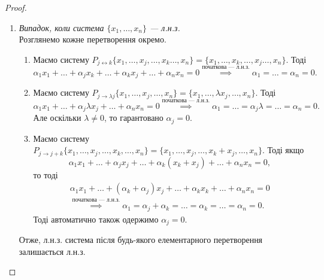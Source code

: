 \documentclass{math_library}
\begin{document}
	\begin{proof}
	\leavevmode
	\begin{enumerate}[topsep=0pt, wide=0pt,label={\roman*.}]
	\item \textit{Випадок, коли система $\{x_1, \dots, x_n\}$ --- л.н.з.}\\	
	Розглянемо кожне перетворення окремо.
	\begin{enumerate}[wide = 0pt, label={\Roman*.}]
	\item Маємо систему $P_{j \leftrightarrow k}\{x_1, \dots, x_j, \dots, x_k \dots, x_n\} = \{x_1, \dots, x_k, \dots, x_j \dots, x_n\}$. Тоді
	\[
	\alpha_1 x_1 + \dots + \alpha_j x_k + \dots + \alpha_k x_j + \dots + \alpha_n x_n = 0 \overset{\text{початкова --- л.н.з.}}{\implies} \alpha_1 = \dots = \alpha_n = 0.
	\]
	\item Маємо систему $P_{j \to \lambda j}\{x_1, \dots, x_j, \dots, x_n\} = \{x_1, \dots, \lambda x_j, \dots, x_n\}$. Тоді
	\[
	\alpha_1 x_1 + \dots + \alpha_j \lambda x_j + \dots + \alpha_n x_n = 0 \overset{\text{початкова --- л.н.з.}}{\implies} \alpha_1 = \dots = \alpha_j \lambda = \dots = \alpha_n = 0.
	\]
	Але оскільки $\lambda \neq 0$, то гарантовано $\alpha_j = 0$.
	
	\item Маємо систему $P_{j \to j+k}\{x_1, \dots, x_j, \dots, x_k, \dots, x_n\} = \{x_1, \dots, x_j, \dots,  x_k + x_j, \dots, x_n\}$. Тоді якщо
	\[
	\alpha_1 x_1 + \dots + \alpha_j x_j + \dots + \alpha_k(x_k + x_j) + \dots + \alpha_n x_n = 0,
	\]
	то тоді
	\begin{align*}
	\alpha_1 x_1 + \dots + (\alpha_k + \alpha_j) x_j + \dots + \alpha_k x_k + \dots + \alpha_n x_n = 0 \\
	\overset{\text{початкова --- л.н.з.}}{\implies}
	\alpha_1 = \alpha_j + \alpha_k = \dots = \alpha_k = \dots = \alpha_n = 0.
	\end{align*}
	Тоді автоматично також одержимо $\alpha_j = 0$.
	\end{enumerate}
	Отже, л.н.з. система після будь-якого елементарного перетворення залишається л.н.з.
	

\end{enumerate}
\end{proof}
\end{document}
